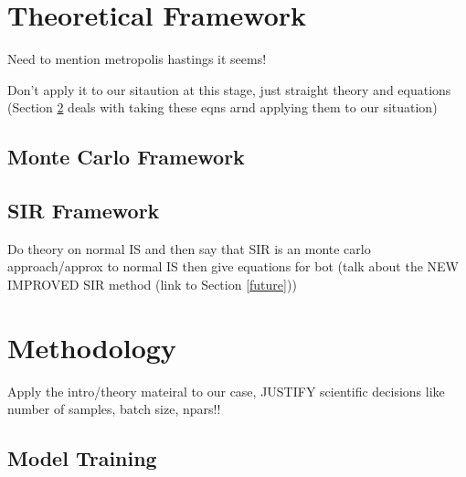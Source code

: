 \documentclass[aps,superscriptaddress,twocolumn,nopreprintnumbers,floatfix,groupedaddress]{revtex4-1}
\begin{document}
%
%
%

\section{Theoretical Framework}\label{theory}

Need to mention metropolis hastings it seems!

Don't apply it to our sitaution at this stage, just straight theory and equations (Section \ref{methods} deals with taking these eqns arnd applying them to our situation)

\subsection{Monte Carlo Framework}\label{theory:monte}

\subsection{SIR Framework}\label{theory:sir}

Do theory on normal IS and then say that SIR is an monte carlo approach/approx to normal IS then give equations for bot (talk about the NEW IMPROVED SIR method (link to Section \ref{future}))

%

\section{Methodology}\label{methods}

Apply the intro/theory mateiral to our case, JUSTIFY scientific decisions like number of samples, batch size, npars!!

\subsection{Model Training}
\end{document}
